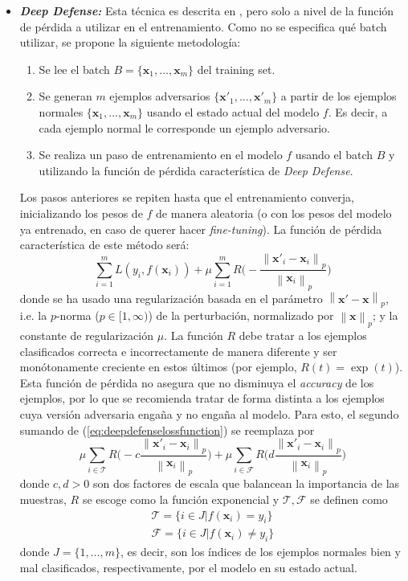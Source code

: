 \documentclass[conference]{IEEEtran}
\newcommand{\norm}[1]{\left\lVert#1\right\rVert}
\begin{document}
\begin{itemize}
\item \textbf{\textit{Deep Defense:}} Esta técnica es descrita en \cite{deepdefense}, pero solo a nivel de la función de pérdida a utilizar en el entrenamiento. Como no se especifica qué batch utilizar, se propone la siguiente metodología:
\begin{enumerate}
			\item Se lee el batch $B=\{\bm{x}_1,...,\bm{x}_m\}$ del training set.
			\item Se generan $m$ ejemplos adversarios $\{\bm{x'}_1,...,\bm{x'}_m\}$ a partir de los ejemplos normales $\{\bm{x}_1,...,\bm{x}_m\}$ usando el estado actual del modelo $f$. Es decir, a cada ejemplo normal le corresponde un ejemplo adversario.
			\item Se realiza un paso de entrenamiento en el modelo $f$ usando el batch $B$ y utilizando la función de pérdida característica de \textit{Deep Defense}.
		\end{enumerate}
Los pasos anteriores se repiten hasta que el entrenamiento converja, inicializando los pesos de $f$ de manera aleatoria (o con los pesos del modelo ya entrenado, en caso de querer hacer \textit{fine-tuning}). La función de pérdida característica de este método será:
\begin{equation}\label{eq:deepdefenselossfunction}
	\sum_{i=1}^m L(y_i, f(\bm{x}_i)) + \mu \sum_{i=1}^m R\bigg( -\frac{\norm{\bm{x'}_i - \bm{x}_i}_p}{\norm{\bm{x}_i}_p}  \bigg)
\end{equation}
donde se ha usado una regularización basada en el parámetro $\norm{\bm{x'}-\bm{x}}_p$, i.e. la $p$-norma ($p \in [1, \infty)$) de la perturbación, normalizado por $\norm{\bm{x}}_p$; y la constante de regularización $\mu$. La función $R$ debe tratar a los ejemplos clasificados correcta e incorrectamente de manera diferente y ser monótonamente creciente en estos últimos (por ejemplo, $R(t) = \exp(t)$). Esta función de pérdida no asegura que no disminuya el \textit{accuracy} de los ejemplos, por lo que se recomienda tratar de forma distinta a los ejemplos cuya versión adversaria engaña y no engaña al modelo. Para esto, el segundo sumando de (\ref{eq:deepdefenselossfunction}) se reemplaza por
\begin{equation}
	\mu \sum_{i \in \mathcal{T}} R \bigg( -c\frac{\norm{\bm{x'}_i - \bm{x}_i}_p}{\norm{\bm{x}_i}_p}  \bigg) + \mu \sum_{i \in \mathcal{F}} R \bigg( d\frac{\norm{\bm{x'}_i - \bm{x}_i}_p}{\norm{\bm{x}_i}_p}  \bigg)
\end{equation}
donde $c,d > 0$ son dos factores de escala que balancean la importancia de las muestras, $R$ se escoge como la función exponencial y $\mathcal{T}, \mathcal{F}$ se definen como
\begin{align}
	\mathcal{T}=\{ i\in J | f(\bm{x}_i) = y_i \}\\
\mathcal{F}=\{ i\in J  | f(\bm{x}_i) \neq y_i \} \end{align}
donde $J=\{ 1,\dots, m \}$, es decir, son los índices de los ejemplos normales bien y mal clasificados, respectivamente, por el modelo en su estado actual.
\end{itemize}
\end{document}
